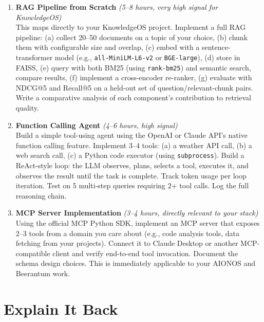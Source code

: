 \documentclass[11pt, a4paper]{article}
\begin{document}
\begin{enumerate}[leftmargin=2em]
  \item \textbf{RAG Pipeline from Scratch} \textit{(5--8 hours, very high signal for KnowledgeOS)}\\
  This maps directly to your KnowledgeOS project. Implement a full RAG pipeline: (a) collect 20--50 documents on a topic of your choice, (b) chunk them with configurable size and overlap, (c) embed with a sentence-transformer model (e.g., \texttt{all-MiniLM-L6-v2} or \texttt{BGE-large}), (d) store in FAISS, (e) query with both BM25 (using \texttt{rank-bm25}) and semantic search, compare results, (f) implement a cross-encoder re-ranker, (g) evaluate with NDCG@5 and Recall@5 on a held-out set of question/relevant-chunk pairs. Write a comparative analysis of each component's contribution to retrieval quality.

  \item \textbf{Function Calling Agent} \textit{(4--6 hours, high signal)}\\
  Build a simple tool-using agent using the OpenAI or Claude API's native function calling feature. Implement 3--4 tools: (a) a weather API call, (b) a web search call, (c) a Python code executor (using \texttt{subprocess}). Build a ReAct-style loop: the LLM observes, plans, selects a tool, executes it, and observes the result until the task is complete. Track token usage per loop iteration. Test on 5 multi-step queries requiring 2+ tool calls. Log the full reasoning chain.

  \item \textbf{MCP Server Implementation} \textit{(3--4 hours, directly relevant to your stack)}\\
  Using the official MCP Python SDK, implement an MCP server that exposes 2--3 tools from a domain you care about (e.g., code analysis tools, data fetching from your projects). Connect it to Claude Desktop or another MCP-compatible client and verify end-to-end tool invocation. Document the schema design choices. This is immediately applicable to your AIONOS and Beerantum work.
\end{enumerate}

\newpage
\section{Explain It Back}
\end{document}
